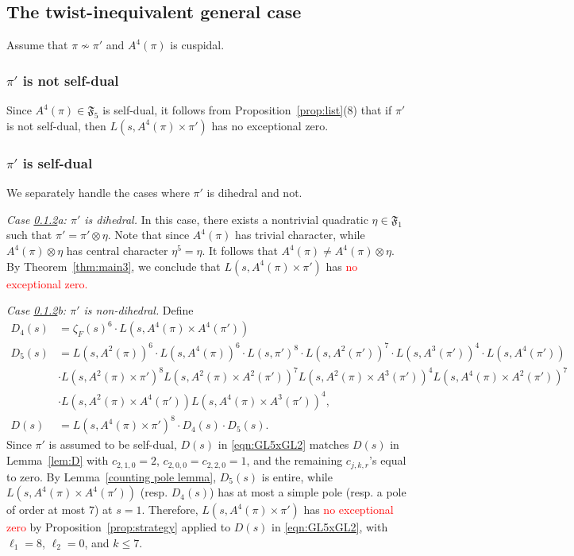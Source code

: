 \documentclass[11pt]{amsart}
\theoremstyle{remark}
\numberwithin{equation}{section}
\begin{document}
\subsection{The twist-inequivalent general case}
Assume that $\pi \not\sim \pi'$ and $A^4(\pi)$ is cuspidal. 

\subsubsection{$\pi'$ is not self-dual}

Since $A^4(\pi)\in\mathfrak{F}_5$ is self-dual, it follows from Proposition~\ref{prop:list}(8) that if $\pi'$ is not self-dual, then $L(s,A^4(\pi)\times\pi')$ has {\color{red}no exceptional zero}.

\subsubsection{$\pi'$ is self-dual}
\label{subsubsec:5x2_self-dual}

We separately handle the cases where $\pi'$ is dihedral and not.

{\it Case \ref{subsubsec:5x2_self-dual}a: $\pi'$ is dihedral.}  In this case, there exists a nontrivial quadratic $\eta\in\mathfrak{F}_1$ such that $\pi'=\pi'\otimes\eta$.  Note that since $A^4(\pi)$ has trivial character, while $A^4(\pi)\otimes\eta$ has central character $\eta^5=\eta$.  It follows that $A^4(\pi) \neq A^4(\pi) \otimes \eta$. By Theorem~\ref{thm:main3}, we conclude that $L(s,A^4(\pi) \times \pi')$ has \textcolor{red}{no exceptional zero.} 

{\it Case \ref{subsubsec:5x2_self-dual}b: $\pi'$ is non-dihedral.}  Define
\begin{equation}
\label{eqn:GL5xGL2}
\begin{aligned}
    D_4(s) &= \zeta_F(s)^6 \cdot L(s,A^4(\pi) \times A^4(\pi')) \\
    D_5(s) &= L(s,A^2(\pi))^6 \cdot L(s,A^4(\pi))^6 \cdot L(s,\pi')^8 \cdot L(s,A^2(\pi'))^7 \cdot L(s,A^3(\pi'))^4 \cdot L(s,A^4(\pi'))\\
    &\cdot L(s,A^2(\pi)\times\pi')^8 L(s,A^2(\pi)\times A^2(\pi'))^7 L(s,A^2(\pi)\times A^3(\pi'))^4 L(s,A^4(\pi)\times A^2(\pi'))^7\\
    &\cdot L(s,A^2(\pi)\times A^4(\pi')) L(s,A^4(\pi)\times A^3(\pi'))^4,\\
    D(s)&=L(s,A^4(\pi) \times \pi')^8 \cdot D_4(s) \cdot D_5(s).
\end{aligned}
\end{equation}
Since $\pi'$ is assumed to be self-dual, $D(s)$ in \eqref{eqn:GL5xGL2}  matches $D(s)$ in Lemma~\ref{lem:D} with $c_{2,1,0}=2$, $c_{2,0,0}=c_{2,2,0}=1$, and the remaining $c_{j,k,r}$'s equal to zero.  By Lemma~\ref{counting pole lemma}, $D_5(s)$ is entire, while $L(s,A^4(\pi) \times A^4(\pi'))$ (resp. $D_4(s)$) has at most a simple pole (resp. a pole of order at most $7$) at $s=1$.  Therefore, $L(s,A^4(\pi) \times \pi')$ has \textcolor{red}{no exceptional zero} by Proposition~\ref{prop:strategy} applied to $D(s)$ in \eqref{eqn:GL5xGL2}, with $\ell_1=8$, $\ell_2=0$, and $k\leq 7$.
\end{document}
